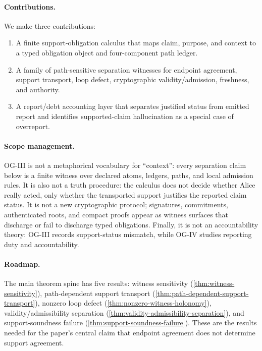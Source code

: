 \documentclass[11pt,twoside]{article}
\theoremstyle{definition}
\begin{document}
\paragraph{Contributions.}
We make three contributions:
\begin{enumerate}[leftmargin=*,label=\arabic*.]
  \item A finite support-obligation calculus that maps claim, purpose, and
        context to a typed obligation object and four-component path ledger.
  \item A family of path-sensitive separation witnesses for endpoint agreement,
        support transport, loop defect, cryptographic validity/admission,
        freshness, and authority.
  \item A report/debt accounting layer that separates justified status from
        emitted report and identifies supported-claim hallucination as a
        special case of overreport.
\end{enumerate}

\paragraph{Scope management.}
\label{sec:what-this-is-not}

OG-III is not a metaphorical vocabulary for \enquote{context}: every separation
claim below is a finite witness over declared atoms, ledgers, paths, and local
admission rules. It is also not a truth procedure: the calculus does not decide
whether Alice really acted, only whether the transported support justifies the
reported claim status. It is not a new cryptographic protocol; signatures,
commitments, authenticated roots, and compact proofs appear as witness surfaces
that discharge or fail to discharge typed obligations. Finally, it is not an
accountability theory: OG-III records support-status mismatch, while OG-IV
studies reporting duty and accountability.

\paragraph{Roadmap.}
\label{sec:results-roadmap}

The main theorem spine has five results: witness sensitivity
(\cref{thm:witness-sensitivity}), path-dependent support transport
(\cref{thm:path-dependent-support-transport}), nonzero loop defect
(\cref{thm:nonzero-witness-holonomy}), validity/admissibility separation
(\cref{thm:validity-admissibility-separation}), and support-soundness failure
(\cref{thm:support-soundness-failure}). These are the results needed for the
paper's central claim that endpoint agreement does not determine support
agreement.
\end{document}
